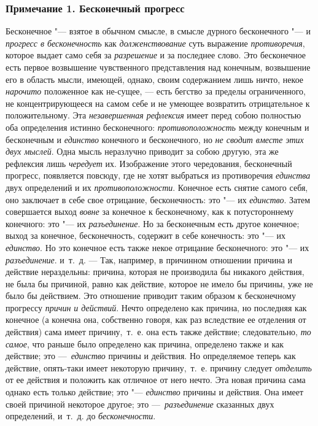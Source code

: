 \subsubsection[Примечание 1. Бесконечный прогресс]
{Примечание 1. Бесконечный прогресс}

Бесконечное "--- взятое в обычном смысле, в смысле дурного бесконечного "--- и
{\em прогресс в бесконечность} как
{\em долженствование} суть выражение
{\em противоречия}, которое выдает само себя за
{\em разрешение} и за последнее слово. Это бесконечное
есть первое возвышение чувственного представления над конечным, возвышение
его в область мысли, имеющей, однако, своим содержанием лишь ничто, некое
{\em нарочито} положенное как не-сущее, — есть бегство
за пределы ограниченного, не концентрирующееся на самом себе и не умеющее
возвратить отрицательное к положительному. Эта
{\em незавершенная рефлексия} имеет перед собою
полностью оба определения истинно бесконечного:
{\em противоположность} между конечным и бесконечным и
{\em единство} конечного и бесконечного, но
{\em не сводит вместе этих двух мыслей}. Одна мысль
неразлучно приводит за собою другую, эта же рефлексия лишь
{\em чередует} их. Изображение этого чередования,
бесконечный прогресс, появляется повсюду, где не хотят выбраться из
противоречия {\em единства} двух определений и их
{\em противоположности}. Конечное есть снятие самого
себя, оно заключает в себе свое отрицание, бесконечность: это "--- их
{\em единство}. Затем совершается выход
{\em вовне} за конечное к бесконечному, как к
потустороннему конечного: это "--- их {\em разъединение}.
Но за бесконечным есть другое конечное; выход за конечное, бесконечность,
содержит в себе конечность: это "--- их {\em единство}. Но
это конечное есть также некое отрицание бесконечного: это "--- их
{\em разъединение}. и~т.~д. — Так, например, в
причинном отношении причина и действие нераздельны: причина, которая не
производила бы никакого действия, не была бы причиной, равно как действие,
которое не имело бы причины, уже не было бы действием. Это отношение
приводит таким образом к бесконечному прогрессу
{\em причин и действий}. Нечто определено как причина,
но последняя как конечное (а конечна она, собственно говоря, как раз
вследствие ее отделения от действия) сама имеет причину,~т.~е. она есть
также действие; следовательно, {\em то самое}, что
раньше было определено как причина, определено также и как действие; это
—~{\em единство} причины и действия. Но определяемое
теперь как действие, опять-таки имеет некоторую причину,~т.~е. причину
следует {\em отделить} от ее действия и положить как
отличное от него нечто. Эта новая причина сама однако есть только действие;
это "--- {\em единство} причины и действия. Она имеет
своей причиной некоторое другое; это
—~{\em разъединение} сказанных двух определений,
и~т.~д. до {\em бесконечности}.


